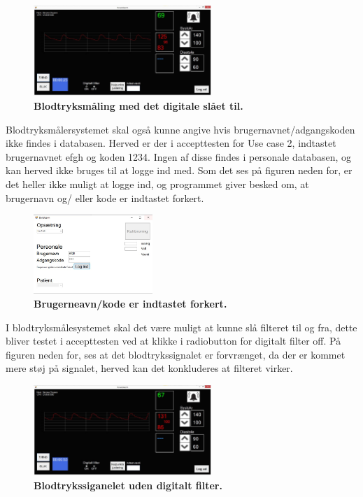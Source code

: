 \begin{figure}[H]
\includegraphics[width =0.6\textwidth , center]{billeder/IThovedGUIkorer}
\caption{\textbf{Blodtryksmåling med det digitale slået til.}}
\end{figure}
Blodtryksmålersystemet skal også kunne angive hvis brugernavnet/adgangskoden ikke findes i databasen. Herved er der i accepttesten for Use case 2, indtastet brugernavnet efgh og koden 1234. Ingen af disse findes i personale databasen, og kan herved ikke bruges til at logge ind med. Som det ses på figuren neden for, er det heller ikke muligt at logge ind, og programmet giver besked om, at brugernavn og/ eller kode er indtastet forkert.
\begin{figure}[H]
\includegraphics[width =0.4\textwidth , center]{billeder/ITstartGUIforkert}
\caption{\textbf{Brugerneavn/kode er indtastet forkert.}}
\end{figure}
I blodtryksmålesystemet skal det være muligt at kunne slå filteret til og fra, dette bliver testet i accepttesten ved at klikke i radiobutton for digitalt filter off. På figuren neden for, ses at det blodtrykssignalet er forvrænget, da der er kommet mere støj på signalet, herved kan det konkluderes at filteret virker. 
\begin{figure}[H]
\includegraphics[width =0.6\textwidth , center]{billeder/IThovedGUIkorerufiltreret}
\caption{\textbf{Blodtrykssiganelet uden digitalt filter.}}
\end{figure}
